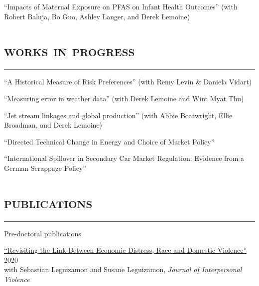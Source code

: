 \documentclass[letterpaper]{article}
\renewenvironment{itemize}{
  \begin{list}{}{
    \setlength{\leftmargin}{1em}
      \setlength{\itemsep}{0.25em}
    \setlength{\parskip}{0pt}
    \setlength{\parsep}{0pt} 
  }
}{
  \end{list}
}
\begin{document}
\begin{itemize}
``Impacts of Maternal Exposure on PFAS on Infant Health Outcomes'' (with Robert Baluja, Bo Guo, Ashley Langer, and Derek Lemoine)


\end{itemize}

\section*{\textsc{\textbf{works in progress}}}
\hrule 
\vspace{.2cm}
\begin{itemize}
\item ``A Historical Measure of Risk Preferences'' (with Remy Levin \& Daniela Vidart)
\vspace{0.3cm}
\item ``Measuring error in weather data'' (with Derek Lemoine and Wint Myat Thu)
\vspace{0.3cm}
\item ``Jet stream linkages and global production'' (with Abbie Boatwright, Ellie Broadman, and Derek Lemoine)
\vspace{0.3cm}
\item ``Directed Technical Change in Energy and Choice of Market Policy''
\vspace{0.3cm}
\item ``International Spillover in Secondary Car Market Regulation: Evidence from a German Scrappage Policy''
\end{itemize}

\section*{\textsc{\textbf{publications}}}
\hrule
\vspace{.2cm}
Pre-doctoral publications
\begin{itemize}
\item \href{https://www.dropbox.com/s/mhxkbqmrir1vqwr/Leguizamon_etal_2020.pdf?dl=0}{``Revisiting the Link Between Economic Distress, Race and Domestic Violence''} \, \hfill 2020  \\ \phantom{\,,}with Sebastian Leguizamon and Susane Leguizamon, \emph{Journal of Interpersonal Violence}
\end{itemize}

%
%
\end{document}
